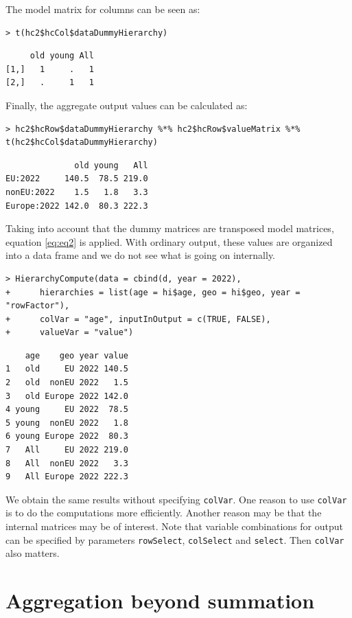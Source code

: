 The model matrix for columns can be seen as:

\begin{verbatim}
> t(hc2$hcCol$dataDummyHierarchy)
\end{verbatim}

\begin{verbatim}
     old young All
[1,]   1     .   1
[2,]   .     1   1
\end{verbatim}

Finally, the aggregate output values can be calculated as:

\begin{verbatim}
> hc2$hcRow$dataDummyHierarchy %*% hc2$hcRow$valueMatrix %*% t(hc2$hcCol$dataDummyHierarchy)
\end{verbatim}

\begin{verbatim}
              old young   All
EU:2022     140.5  78.5 219.0
nonEU:2022    1.5   1.8   3.3
Europe:2022 142.0  80.3 222.3
\end{verbatim}

Taking into account that the dummy matrices are transposed model matrices, equation \eqref{eq:eq2} is applied.
With ordinary output, these values are organized into a data frame and we do not see what is going on internally.

\begin{verbatim}
> HierarchyCompute(data = cbind(d, year = 2022), 
+      hierarchies = list(age = hi$age, geo = hi$geo, year = "rowFactor"), 
+      colVar = "age", inputInOutput = c(TRUE, FALSE),
+      valueVar = "value")
\end{verbatim}

\begin{verbatim}
    age    geo year value
1   old     EU 2022 140.5
2   old  nonEU 2022   1.5
3   old Europe 2022 142.0
4 young     EU 2022  78.5
5 young  nonEU 2022   1.8
6 young Europe 2022  80.3
7   All     EU 2022 219.0
8   All  nonEU 2022   3.3
9   All Europe 2022 222.3
\end{verbatim}

We obtain the same results without specifying \texttt{colVar}.
One reason to use \texttt{colVar} is to do the computations more efficiently.
Another reason may be that the internal matrices may be of interest.
Note that variable combinations for output can be specified by parameters
\texttt{rowSelect}, \texttt{colSelect} and \texttt{select}.
Then \texttt{colVar} also matters.

\hypertarget{aggregation-beyond-summation}{%
\section{Aggregation beyond summation}\label{aggregation-beyond-summation}}

